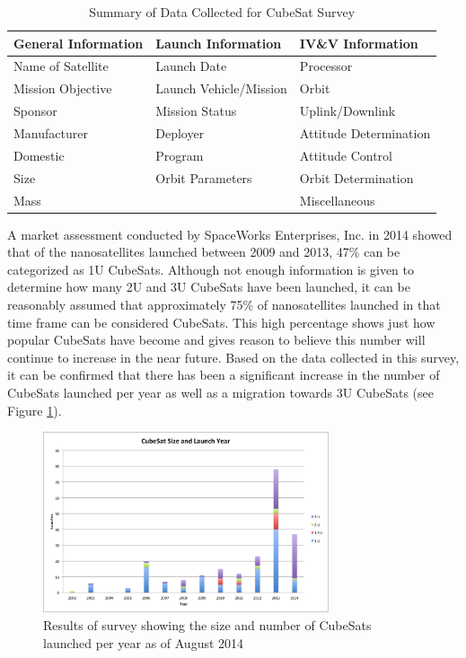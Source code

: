 \documentclass[11pt]{article}
\begin{document}
\begin{table}[h]
\centering
\caption{Summary of Data Collected for CubeSat Survey}
\label{summary}
\begin{tabular}{|l|l|l|}
\hline
\textbf{General Information} & \textbf{Launch Information} & \textbf{IV\&V Information} \\ \hline
Name of Satellite & Launch Date & Processor \\ \hline
Mission Objective & Launch Vehicle/Mission & Orbit \\ \hline
Sponsor & Mission Status & Uplink/Downlink \\ \hline
Manufacturer & Deployer & Attitude Determination \\ \hline
Domestic & Program & Attitude Control \\ \hline
Size & Orbit Parameters & Orbit Determination \\ \hline
Mass &  & Miscellaneous \\ \hline
\end{tabular}
\end{table}
A market assessment conducted by SpaceWorks Enterprises, Inc. in 2014 showed that of the nanosatellites launched between 2009 and 2013, 47\% can be categorized as 1U CubeSats.  Although not enough information is given to determine how many 2U and 3U CubeSats have been launched, it can be reasonably assumed that approximately 75\% of nanosatellites launched in that time frame can be considered CubeSats.  This high percentage shows just how popular CubeSats have become and gives reason to believe this number will continue to increase in the near future.  Based on the data collected in this survey, it can be confirmed that there has been a significant increase in the number of CubeSats launched per year as well as a migration towards 3U CubeSats (see Figure \ref{peryear}). 

\begin{figure}[ht!]
\centering
\includegraphics[width=0.75\textwidth]{SizesPerYear.png}
\caption{Results of survey showing the size and number of CubeSats launched per year as of August 2014}
\label{peryear}
\end{figure}
\end{document}
